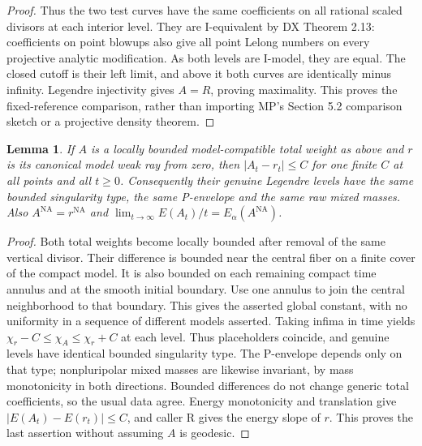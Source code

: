 \documentclass[11pt]{article}
\newtheorem{lemma}[theorem]{Lemma}
\newcommand{\NA}{\mathrm{NA}}
\begin{document}
\begin{proof}
Thus the two test curves have the same coefficients on all rational
scaled divisors at each interior level. They are I-equivalent by
DX Theorem 2.13: coefficients on point blowups also give all point
Lelong numbers on every projective analytic modification. As both
levels are I-model, they are equal. The closed cutoff is their left
limit, and above it both curves are identically minus infinity.
Legendre injectivity gives $A=R$, proving maximality. This proves the
fixed-reference comparison, rather than importing MP's Section 5.2
comparison sketch or a projective density theorem.
\end{proof}

\begin{lemma}\label{compatible}
If $A$ is a locally bounded model-compatible total weight as above and
$r$ is its canonical model weak ray from zero, then
$|A_t-r_t|\le C$ for one finite $C$ at all points and all $t\ge0$.
Consequently their genuine Legendre levels have the same bounded
singularity type, the same P-envelope and the same raw mixed masses.
Also $A^\NA=r^\NA$ and
$\lim_{t\to\infty}E(A_t)/t=E_\alpha(A^\NA)$.
\end{lemma}
\begin{proof}
Both total weights become locally bounded after removal of the same
vertical divisor. Their difference is bounded near the central fiber
on a finite cover of the compact model. It is also bounded on each
remaining compact time annulus and at the smooth initial boundary.
Use one annulus to join the central neighborhood to that boundary.
This gives the asserted global constant, with no uniformity in a
sequence of different models asserted. Taking infima in time yields
$\chi_r-C\le\chi_A\le\chi_r+C$ at each level. Thus placeholders
coincide, and genuine levels have identical bounded singularity type.
The P-envelope depends only on that type; nonpluripolar mixed masses
are likewise invariant, by mass monotonicity in both directions.
Bounded differences do not change generic total coefficients, so the
usual data agree. Energy monotonicity and translation give
$|E(A_t)-E(r_t)|\le C$, and caller R gives the energy slope of $r$.
This proves the last assertion without assuming $A$ is geodesic.
\end{proof}
\end{document}
